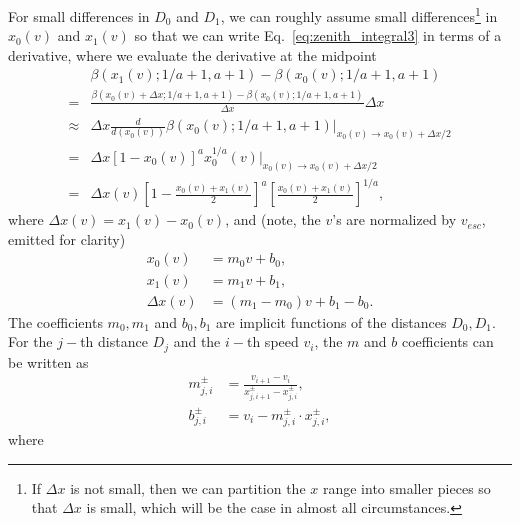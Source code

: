\documentclass{hitec}
\numberwithin{equation}{section}
\begin{document}
For small differences in $D_0$ and $D_1$, we can roughly assume small differences\footnote{If $\Delta x$ is not small, then we can partition the $x$ range into smaller pieces so that $\Delta x$ is small, which will be the case in almost all circumstances.} in $x_0(v)$ and $x_1(v)$ so that we can write Eq.\ \eqref{eq:zenith_integral3} in terms of a derivative, where we evaluate the derivative at the midpoint
\begin{align}
&\beta(x_1(v); 1/a+1, a+1) - \beta(x_0(v); 1/a+1, a+1)\nonumber\\
= &\frac{\beta(x_0(v) +\Delta x; 1/a+1, a+1) - \beta(x_0(v); 1/a+1, a+1)}{\Delta x}\Delta x\nonumber\\
\approx & \Delta x\frac{d}{d(x_0(v))}\beta(x_0(v); 1/a+1, a+1)\Bigr|_{x_0(v)\to x_0(v) +\Delta x/2}\nonumber\\
=& \Delta x\left[1-x_0(v)\right]^a x_0^{1/a}(v)\Bigr|_{x_0(v)\to x_0(v) +\Delta x/2}\nonumber\\
=&\Delta x(v)\left[1-\frac{x_0(v)+x_1(v)}{2}\right]^a \left[\frac{x_0(v)+x_1(v)}{2}\right]^{1/a},
\end{align}
where $\Delta x(v) = x_1(v) - x_0(v)$, and (note, the $v$'s are normalized by $v_{esc}$, emitted for clarity)
\begin{align}
x_0(v) &= m_0 v + b_0,\\
x_1(v) &= m_1 v + b_1,\\
\Delta x(v) &= (m_1-m_0)v + b_1 - b_0.
\end{align}
The coefficients $m_0, m_1$ and $b_0, b_1$ are implicit functions of the distances $D_0, D_1$. For the $j-$th distance $D_j$ and the $i-$th speed $v_i$, the $m$ and $b$ coefficients can be written as
\begin{align}
m_{j,i}^{\pm} &= \frac{v_{i+1}-v_i}{x_{j,i+1}^{\pm}-x_{j,i}^{\pm}},\\
b_{j,i}^{\pm} &= v_i - m_{j,i}^{\pm}\cdot x_{j,i}^{\pm},
\end{align}
where
\end{document}
